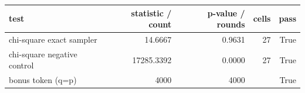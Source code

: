 \begin{tabular}{lrrrr}
\toprule
test & statistic / count & p-value / rounds & cells & pass \\
\midrule
chi-square exact sampler & 14.6667 & 0.9631 & 27 & True \\
chi-square negative control & 17285.3392 & 0.0000 & 27 & True \\
bonus token (q=p) & 4000 & 4000 &  & True \\
\bottomrule
\end{tabular}
